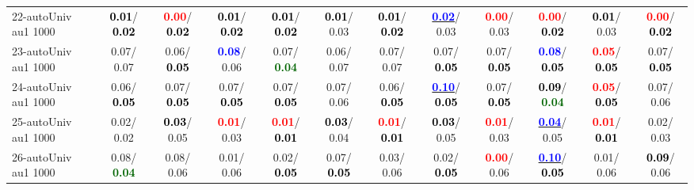 \begin{table}[h]
\begin{center}
{\begin{tabular}{lc|c|c|c|c|c|c|c|c|c|c}
22-autoUniv au1 1000 & \textcolor{black}{\textbf{  0.01}}/\textcolor{black}{\textbf{  0.02}} & \textcolor{red}{\textbf{  0.00}}/\textcolor{black}{\textbf{  0.02}} & \textcolor{black}{\textbf{  0.01}}/\textcolor{black}{\textbf{  0.02}} & \textcolor{black}{\textbf{  0.01}}/\textcolor{black}{\textbf{  0.02}} & \textcolor{black}{\textbf{  0.01}}/  0.03 & \textcolor{black}{\textbf{  0.01}}/\textcolor{black}{\textbf{  0.02}} & \underline{\textcolor{blue}{\textbf{  0.02}}}/  0.03 & \textcolor{red}{\textbf{  0.00}}/  0.03 & \textcolor{red}{\textbf{  0.00}}/\textcolor{black}{\textbf{  0.02}} & \textcolor{black}{\textbf{  0.01}}/  0.03 & \textcolor{red}{\textbf{  0.00}}/\textcolor{black}{\textbf{  0.02}} \\
23-autoUniv au1 1000 &   0.07/  0.07 &   0.06/\textcolor{black}{\textbf{  0.05}} & \textcolor{blue}{\textbf{  0.08}}/  0.06 &   0.07/\textcolor{darkgreen}{\textbf{  0.04}} &   0.06/  0.07 &   0.07/  0.07 &   0.07/\textcolor{black}{\textbf{  0.05}} &   0.07/\textcolor{black}{\textbf{  0.05}} & \textcolor{blue}{\textbf{  0.08}}/\textcolor{black}{\textbf{  0.05}} & \textcolor{red}{\textbf{  0.05}}/\textcolor{black}{\textbf{  0.05}} &   0.07/\textcolor{black}{\textbf{  0.05}} \\
24-autoUniv au1 1000 &   0.06/\textcolor{black}{\textbf{  0.05}} &   0.07/\textcolor{black}{\textbf{  0.05}} &   0.07/\textcolor{black}{\textbf{  0.05}} &   0.07/\textcolor{black}{\textbf{  0.05}} &   0.07/  0.06 &   0.06/\textcolor{black}{\textbf{  0.05}} & \underline{\textcolor{blue}{\textbf{  0.10}}}/\textcolor{black}{\textbf{  0.05}} &   0.07/\textcolor{black}{\textbf{  0.05}} & \textcolor{black}{\textbf{  0.09}}/\textcolor{darkgreen}{\textbf{  0.04}} & \textcolor{red}{\textbf{  0.05}}/\textcolor{black}{\textbf{  0.05}} &   0.07/  0.06 \\
25-autoUniv au1 1000 &   0.02/  0.02 & \textcolor{black}{\textbf{  0.03}}/  0.05 & \textcolor{red}{\textbf{  0.01}}/  0.03 & \textcolor{red}{\textbf{  0.01}}/\textcolor{black}{\textbf{  0.01}} & \textcolor{black}{\textbf{  0.03}}/  0.04 & \textcolor{red}{\textbf{  0.01}}/\textcolor{black}{\textbf{  0.01}} & \textcolor{black}{\textbf{  0.03}}/  0.05 & \textcolor{red}{\textbf{  0.01}}/  0.03 & \underline{\textcolor{blue}{\textbf{  0.04}}}/  0.05 & \textcolor{red}{\textbf{  0.01}}/\textcolor{black}{\textbf{  0.01}} &   0.02/  0.03 \\
26-autoUniv au1 1000 &   0.08/\textcolor{darkgreen}{\textbf{  0.04}} &   0.08/  0.06 &   0.01/  0.06 &   0.02/\textcolor{black}{\textbf{  0.05}} &   0.07/\textcolor{black}{\textbf{  0.05}} &   0.03/  0.06 &   0.02/\textcolor{black}{\textbf{  0.05}} & \textcolor{red}{\textbf{  0.00}}/  0.06 & \underline{\textcolor{blue}{\textbf{  0.10}}}/\textcolor{black}{\textbf{  0.05}} &   0.01/  0.06 & \textcolor{black}{\textbf{  0.09}}/  0.06 \\

\end{tabular}}
\end{center}
\end{table}
